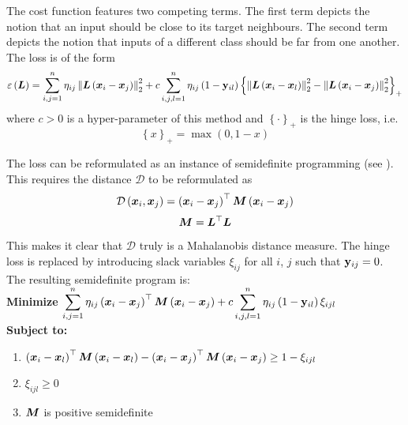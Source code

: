 The cost function features two competing terms. The first term depicts the notion that an input should be close to its target neighbours. The second term depicts the notion that inputs of a different class should be far from one another. The loss is of the form
\[ \varepsilon \left( \bm{L} \right) = \sum_{i, j = 1}^n \mathbf{\eta}_{ij} \left\lVert \bm{L} \left( \bm{x}_i - \bm{x}_j \right) \right\rVert_2^2 + c \sum_{i, j, l = 1}^n \mathbf{\eta}_{ij} \left( 1 - \mathbf{y}_{il} \right) \left\{ \left\lVert \bm{L} \left( \bm{x}_i - \bm{x}_l \right) \right\rVert_2^2 - \left\lVert \bm{L} \left( \bm{x}_i - \bm{x}_j \right) \right\rVert_2^2 \right\}_+ \]
where \( c > 0 \) is a hyper-parameter of this method and \( \left\{ \cdot \right\}_+ \) is the hinge loss, i.e.
\[ \left\{ x \right\}_+ = \max \left( 0, 1 - x \right) \]

The loss can be reformulated as an instance of semidefinite programming (see \cite{vandenberghe_semidefinite_1996}). This requires the distance \( \mathcal{D} \) to be reformulated as
\[ \mathcal{D} \left( \bm{x}_i, \bm{x}_j \right) = \left( \bm{x}_i - \bm{x}_j \right)^\top \bm{M} \left( \bm{x}_i - \bm{x}_j \right) \]
\[ \bm{M} = \bm{L}^\top \bm{L} \]
This makes it clear that \( \mathcal{D} \) truly is a Mahalanobis distance measure. The hinge loss is replaced by introducing slack variables \( \xi_{ij} \) for all \( i \), \( j \) such that \( \mathbf{y}_{ij} = 0 \). The resulting semidefinite program is: \\

\noindent \textbf{Minimize} \( \displaystyle \sum_{i, j = 1}^n \mathbf{\eta}_{ij} \left( \bm{x}_i - \bm{x}_j \right)^\top \bm{M} \left( \bm{x}_i - \bm{x}_j \right) + c \sum_{i, j, l = 1}^n \mathbf{\eta}_{ij} \left( 1 - \mathbf{y}_{il} \right) \xi_{ijl} \) \\
\textbf{Subject to:}
\begin{enumerate}[\textbf{(\theenumi)}]
  \item \( \displaystyle \left( \bm{x}_i - \bm{x}_l \right)^\top \bm{M} \left( \bm{x}_i - \bm{x}_l \right) - \left( \bm{x}_i - \bm{x}_j \right)^\top \bm{M} \left( \bm{x}_i - \bm{x}_j \right) \geq 1 - \xi_{ijl} \)
  \item \( \displaystyle \xi_{ijl} \geq 0 \)
  \item \( \displaystyle \bm{M} \) is positive semidefinite
\end{enumerate}

